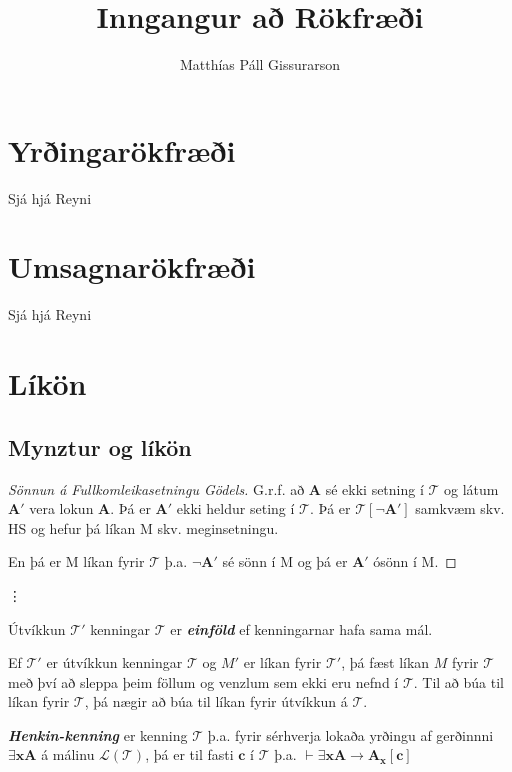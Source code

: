 \documentclass[12pt]{book}
\title{Inngangur að Rökfræði}
\author{Matthías Páll Gissurarson}
\newcommand{\cT}{\mathcal{T}}
\newcommand{\cL}{\mathcal{L}}
\newcommand{\emphs}[1]{\textbf{\emph{#1}}}
\begin{document}
\maketitle


\chapter{Yrðingarökfræði}

Sjá hjá Reyni
\chapter{Umsagnarökfræði}

Sjá hjá Reyni

\chapter{Líkön}

\section{Mynztur og líkön}

\begin{proof}[Sönnun á Fullkomleikasetningu Gödels]
  G.r.f. að $\mathbf{A}$ sé ekki setning í $\mathcal{T}$ og látum $\mathbf{A}'$
  vera lokun $\mathbf{A}$. Þá er $\mathbf{A}'$ ekki heldur seting í
  $\mathcal{T}$. Þá er $\mathcal{T}[\lnot \mathbf{A}']$ samkvæm skv. HS og hefur
  þá líkan M skv. meginsetningu.

  En þá er M líkan fyrir $\mathcal{T}$ þ.a. $\lnot \mathbf{A}'$ sé sönn í M
  og þá er $\mathbf{A}'$ ósönn í M.
  
\end{proof}

\vdots

\begin{skgr}[Viðbót]
 Útvíkkun $\cT'$ kenningar $\cT$ er \emphs{einföld} ef kenningarnar hafa
sama mál. 
\end{skgr}


\begin{setn}[Hjálparsetn]
 Ef $\cT'$ er útvíkkun kenningar $\cT$ og $M'$ er líkan fyrir $\cT'$,
þá fæst líkan $M$ fyrir $\cT$ með því að sleppa þeim föllum og venzlum
sem ekki eru nefnd í $\cT$. Til að búa til líkan fyrir $\cT$, þá nægir að
búa til líkan fyrir útvíkkun á $\cT$. 
\end{setn}

\begin{skgr}
  \emphs{Henkin-kenning} er kenning $\cT$ þ.a. fyrir sérhverja lokaða yrðingu af
gerðinnni \( \exists \mathbf{x}\mathbf{A}\) á málinu $\cL(\cT)$, þá
  er til fasti \(\mathbf{c}\) í $\mathcal{T}$ þ.a. $\vdash  \exists \mathbf{x}\mathbf{A} \rightarrow  \mathbf{A}_{\mathbf{x}}[\mathbf{c}]$
\end{skgr}
\end{document}
